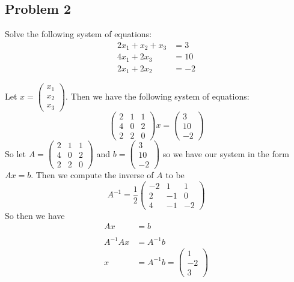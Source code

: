 \documentclass{article}
\theoremstyle{definition}
\begin{document}
    \subsection*{Problem 2}
        \begin{mdframed}[]
            Solve the following system of equations:
            \begin{align*}
                2x_1 + x_2 + x_3 &= 3\\
                4x_1 + 2x_3 &= 10 \\
                2x_1 + 2x_2 &= -2
            \end{align*}
        \end{mdframed}
        Let $x = \begin{pmatrix}
            x_1 \\ x_2 \\ x_3
        \end{pmatrix}$. Then we have the following system of equations:
        \[
            \begin{pmatrix}
                2 & 1 & 1\\4 & 0 & 2 \\ 2 & 2 & 0
            \end{pmatrix}x = \begin{pmatrix}
                3 \\ 10 \\ -2
            \end{pmatrix}
        \]
        So let $A = \begin{pmatrix}
            2 & 1 & 1\\4 & 0 & 2 \\ 2 & 2 & 0
        \end{pmatrix}$ and $b = \begin{pmatrix}
            3 \\ 10 \\ -2
        \end{pmatrix}$ so we have our system in the form $Ax = b$. Then we compute the inverse of $A$ to be 
        \[
            A^{-1} = \frac{1}{2}\begin{pmatrix}
                -2 & 1 & 1 \\ 2 & -1 & 0\\ 4 & -1 & -2
            \end{pmatrix}
        \]
        So then we have 
        \begin{align*}
            Ax &= b\\\\
            A^{-1}Ax &= A^{-1}b \\
            x &= A^{-1}b = \begin{pmatrix}
            1\\-2\\3
        \end{pmatrix}
    \end{align*}
\end{document}

